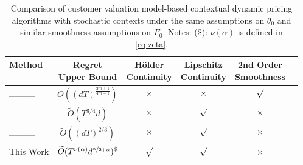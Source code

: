 \begin{table*}[t]
\caption{Comparison of customer valuation model-based contextual dynamic pricing algorithms with stochastic contexts under the same assumptions on $\theta_0$ and similar smoothness assumptions on $F_0$. Notes: 
($\mathdollar$): $\nu(\alpha)$ is defined in \cref{eq:zeta}.}

\label{Comparison}
\centering
\begin{small}
\begin{sc}
\begin{tabular}{lccccc}
\toprule
Method  & \thead{Regret\\ Upper Bound} & \thead{H\"older\\ Continuity}& \thead{Lipschitz\\ Continuity} & \thead{2nd Order\\ Smoothness} \\
\midrule
____    & $\widetilde{O}((dT)^{\frac{2m+1}{4m-1}} )$ & $\times$ &  $\times$ & $\surd$  \\
____  & $\widetilde{O}(T^{3/4} d)$ & $\times$ & $\surd$ & $\times$ \\
____  & $\widetilde{O}((dT)^{2/3})$ & $\times$ & $\surd$ & $\times$ \\
This Work & $\widetilde{O}(T^{\nu(\alpha)}d^{\nicefrac{\alpha}{2+\alpha}})^{\mathdollar}$ & $\surd$ & $\surd$ & $\times$ & \\
\bottomrule
\end{tabular}
\end{sc}
\end{small}
\end{table*}